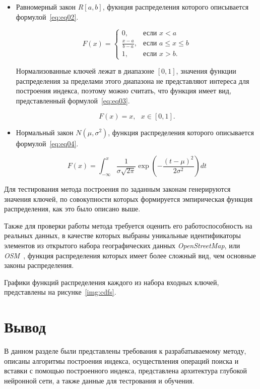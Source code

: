 \begin{itemize}
    \item Равномерный закон $R[a,b]$, фукнция распределения которого описывается
        формулой~\ref{eq:eq02}.

        \begin{equation}\label{eq:eq02}
            F(x) = \begin{cases}
                0, & \text{если } x < a \\
                \frac{x - a}{b - a}, & \text{если } a \leq x \leq b \\
                1, & \text{если } x > b.
            \end{cases}
        \end{equation}

        Нормализованные ключей лежат в диапазоне $[0, 1]$, значения функции
        распределения за пределами этого диапазона не представляют интереса для
        построения индекса, поэтому можно считать, что функция имеет вид,
        представленный формулой~\ref{eq:eq03}.

        \begin{equation}\label{eq:eq03}
            F(x) = x, \text{  } x \in [0, 1].
        \end{equation}

    \item Нормальный закон $N(\mu, \sigma^2)$, функция распределения которого
        описывается формулой~\ref{eq:eq04}.

        \begin{equation}\label{eq:eq04}
            F(x) = \int_{-\infty}^{x} \frac{1}{{\sigma \sqrt{2\pi}}}
            \exp\left(-\frac{{(t - \mu)^2}}{{2\sigma^2}}\right) dt
        \end{equation}
\end{itemize}

Для тестирования метода построения по заданным законам генерируются значения
ключей, по совокупности которых формируется эмпирическая функция распределения,
как это было описано выше.

Также для проверки работы метода требуется оценить его работоспособность на
реальных данных, в качестве которых выбраны уникальные идентификаторы элементов
из открытого набора географических данных \textit{OpenStreetMap}, или
\textit{OSM}~\cite{osm}, функция распределения которых имеет более сложный вид,
чем основные законы распределения.

Графики функций распределения каждого из набора входных ключей, представлены на
рисунке~\ref{img:cdfs}.


\section*{Вывод}

В данном разделе были представлены требования к разрабатываемому методу, описаны
алгоритмы построения индекса, осуществления операций поиска и вставки с помощью
построенного индекса, представлена архитектура глубокой нейронной сети, а также
данные для тестрования и обучения.
